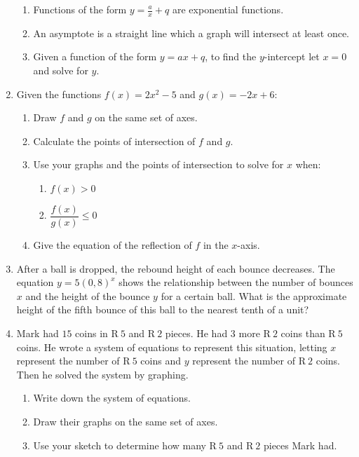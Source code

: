 \begin{eocexercises}{}
\begin{enumerate}[itemsep=9pt, label=\textbf{\arabic*}. ]
\begin{enumerate}[noitemsep, label=\textbf{(\alph*)} ]
    \item Functions of the form $y=\frac{a}{x}+q$ are exponential functions.
    \item  An asymptote is a straight line which a graph will intersect at least once.
    \item Given a function of the form $y=ax+q$, to find the $y$-intercept let $x=0$ and solve for $y$.
    \end{enumerate}
  \item Given the functions $f(x)=2{x}^{2}-5$ and $g(x)=-2x+6$:
    \begin{enumerate}[noitemsep, label=\textbf{(\alph*)} ] %
    \item Draw $f$ and $g$ on the same set of axes.
    \item Calculate the points of intersection of $f$ and $g$.
    \item Use your graphs and the points of intersection to solve for $x$ when:
      \begin{enumerate}[noitemsep, label=\textbf{\roman*}. ] %
      \item $f(x)>0$
      \item $\dfrac{f(x)}{g(x)}\leq 0$
      \end{enumerate}
    \item Give the equation of the reflection of $f$ in the $x$-axis.
    \end{enumerate}
  \item After a ball is dropped, the rebound height of each bounce
    decreases. The equation $y=5{(0,8)}^{x}$ shows the relationship
    between the number of bounces $x$ and the height of the bounce $y$
    for a certain ball.  What is the approximate height of the fifth
    bounce of this ball to the nearest tenth of a unit?
  \item Mark had $15$ coins in R$~5$ and R$~2$ pieces. He had $3$ more
    R$~2$ coins than R$~5$ coins. He wrote a system of equations to
    represent this situation, letting $x$ represent the number of R$~5$
    coins and $y$ represent the number of R$~2$ coins. Then he solved
    the system by graphing.
    \begin{enumerate}[noitemsep, label=\textbf{(\alph*)} ] %
    \item Write down the system of equations.
    \item Draw their graphs on the same set of axes.
    \item Use your sketch to determine how many R$~5$ and R$~2$ pieces Mark had.

\end{enumerate}
\end{enumerate}
\end{eocexercises}
